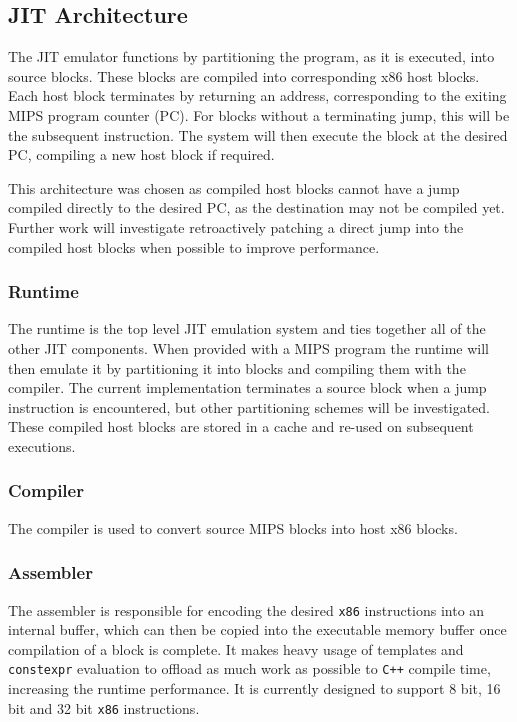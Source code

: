 \subsection{JIT Architecture}

The JIT emulator functions by partitioning the program, as it is executed, into source blocks. These blocks are compiled into corresponding x86 host blocks. Each host block terminates by returning an address, corresponding to the exiting MIPS program counter (PC). For blocks without a terminating jump, this will be the subsequent instruction. The system will then execute the block at the desired PC, compiling a new host block if required.

This architecture was chosen as compiled host blocks cannot have a jump compiled directly to the desired PC, as the destination may not be compiled yet. Further work will investigate retroactively patching a direct jump into the compiled host blocks when possible to improve performance.

\subsubsection{Runtime}

The runtime is the top level JIT emulation system and ties together all of the other JIT components. When provided with a MIPS program the runtime will then emulate it by partitioning it into blocks and compiling them with the compiler. The current implementation terminates a source block when a jump instruction is encountered, but other partitioning schemes will be investigated. These compiled host blocks are stored in a cache and re-used on subsequent executions.

\subsubsection{Compiler}

The compiler is used to convert source MIPS blocks into host x86 blocks.

\subsubsection{Assembler}

The assembler is responsible for encoding the desired \texttt{x86} instructions into an internal buffer, which can then be copied into the executable memory buffer once compilation of a block is complete. It makes heavy usage of templates and \texttt{constexpr} evaluation to offload as much work as possible to \texttt{C++} compile time, increasing the runtime performance. It is currently designed to support 8 bit, 16 bit and 32 bit \texttt{x86} instructions.

